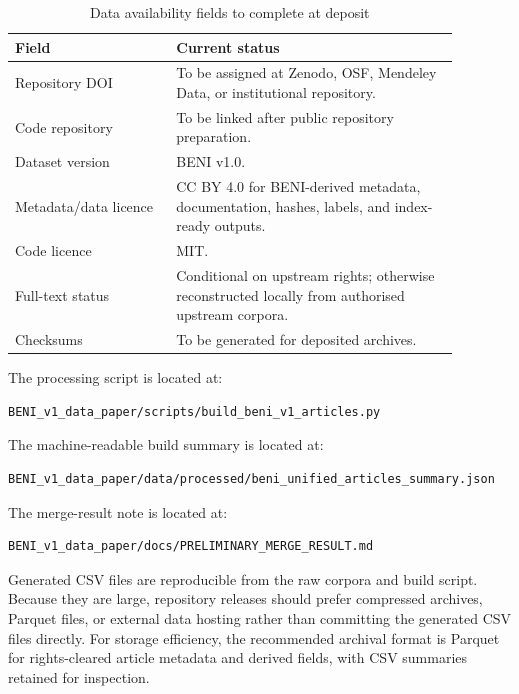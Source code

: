 \documentclass[11pt]{article}
\begin{document}
\begin{table}[htbp]
\centering
\caption{Data availability fields to complete at deposit}
\label{tab:data-availability}
\begin{tabular}{L{0.32\linewidth}L{0.56\linewidth}}
\toprule
Field & Current status\\
\midrule
Repository DOI & To be assigned at Zenodo, OSF, Mendeley Data, or institutional repository.\\
Code repository & To be linked after public repository preparation.\\
Dataset version & BENI v1.0.\\
Metadata/data licence & CC BY 4.0 for BENI-derived metadata, documentation, hashes, labels, and index-ready outputs.\\
Code licence & MIT.\\
Full-text status & Conditional on upstream rights; otherwise reconstructed locally from authorised upstream corpora.\\
Checksums & To be generated for deposited archives.\\
\bottomrule
\end{tabular}
\end{table}

The processing script is located at:

\begin{verbatim}
BENI_v1_data_paper/scripts/build_beni_v1_articles.py
\end{verbatim}

The machine-readable build summary is located at:

\begin{verbatim}
BENI_v1_data_paper/data/processed/beni_unified_articles_summary.json
\end{verbatim}

The merge-result note is located at:

\begin{verbatim}
BENI_v1_data_paper/docs/PRELIMINARY_MERGE_RESULT.md
\end{verbatim}

Generated CSV files are reproducible from the raw corpora and build script. Because they are large, repository releases should prefer compressed archives, Parquet files, or external data hosting rather than committing the generated CSV files directly. For storage efficiency, the recommended archival format is Parquet for rights-cleared article metadata and derived fields, with CSV summaries retained for inspection.
\end{document}
